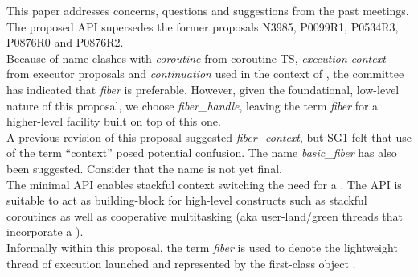 
This paper addresses concerns, questions and suggestions from the past meetings.
The proposed API supersedes the former proposals N3985\cite{N3985},
P0099R1\cite{P0099R1}, P0534R3\cite{P0534R3}, P0876R0\cite{P0876R0}
and P0876R2\cite{P0876R2}.\\
Because of name clashes with \emph{coroutine} from coroutine TS,
\emph{execution context} from executor proposals and \emph{continuation} used
in the context of , the committee has indicated
that \emph{fiber} is preferable. However, given the foundational, low-level
nature of this proposal, we choose \emph{fiber\_handle}, leaving the
term \emph{fiber} for a higher-level facility built on top of this one.\\

A previous revision of this proposal suggested \emph{fiber\_context}, but SG1
felt that use of the term ``context'' posed potential confusion. The name 
\emph{basic\_fiber} has also been suggested. Consider that the name is not yet
final.\\

The minimal API enables stackful context switching  the need for a
. The API is suitable to act as building-block for high-level
constructs such as stackful coroutines as well as cooperative multitasking
(aka user-land/green threads that incorporate a ).\\

Informally within this proposal, the term \emph{fiber} is used to denote the
lightweight thread of execution launched and represented by the first-class
object \fiber.
